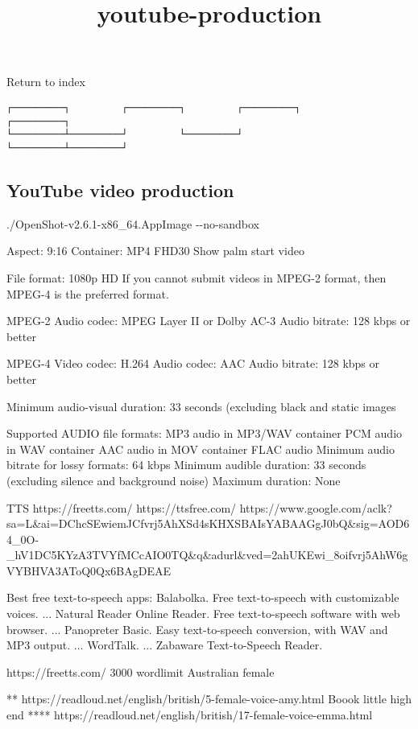 \documentclass[
]{article}
\title{youtube-production}
\author{}
\date{}
\begin{document}
\maketitle

Return to index

\begin{verbatim}
┌─────────┐         ┌─────────┐         ┌─────────┐         ┌─────────┐
└─────────┴─────────┘         └─────────┘         └─────────┴─────────┘
\end{verbatim}

\subsection{YouTube video production}

./OpenShot-v2.6.1-x86\_64.AppImage -\/-no-sandbox

Aspect: 9:16 Container: MP4 FHD30 Show palm start video

File format: 1080p HD If you cannot submit videos in MPEG-2 format, then
MPEG-4 is the preferred format.

MPEG-2 Audio codec: MPEG Layer II or Dolby AC-3 Audio bitrate: 128 kbps
or better

MPEG-4 Video codec: H.264 Audio codec: AAC Audio bitrate: 128 kbps or
better

Minimum audio-visual duration: 33 seconds (excluding black and static
images

Supported AUDIO file formats: MP3 audio in MP3/WAV container PCM audio
in WAV container AAC audio in MOV container FLAC audio Minimum audio
bitrate for lossy formats: 64 kbps Minimum audible duration: 33 seconds
(excluding silence and background noise) Maximum duration: None

TTS https://freetts.com/ https://ttsfree.com/
https://www.google.com/aclk?sa=L\&ai=DChcSEwiemJCfvrj5AhXSd4sKHXSBAIsYABAAGgJ0bQ\&sig=AOD64\_0O-\_hV1DC5KYzA3TVYfMCcAIO0TQ\&q\&adurl\&ved=2ahUKEwi\_8oifvrj5AhW6gVYBHVA3AToQ0Qx6BAgDEAE

Best free text-to-speech apps: Balabolka. Free text-to-speech with
customizable voices. ... Natural Reader Online Reader. Free
text-to-speech software with web browser. ... Panopreter Basic. Easy
text-to-speech conversion, with WAV and MP3 output. ... WordTalk. ...
Zabaware Text-to-Speech Reader.

https://freetts.com/ 3000 wordlimit Australian female

** https://readloud.net/english/british/5-female-voice-amy.html Boook
little high end ****
https://readloud.net/english/british/17-female-voice-emma.html
\end{document}
